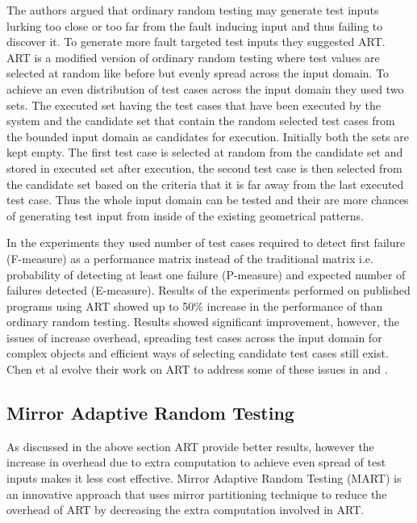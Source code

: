 The authors argued that ordinary random testing may generate test inputs lurking too close or too far from the fault inducing input and thus failing to discover it. To generate more fault targeted test inputs they suggested ART. ART is a modified version of ordinary random testing where test values are selected at random like before but evenly spread across the input domain. To achieve an even distribution of test cases across the input domain they used two sets. The executed set having the test cases that have been executed by the system and the candidate set that contain the random selected test cases from the bounded input domain as candidates for execution. Initially both the sets are kept empty. The first test case is selected at random from the candidate set and stored in executed set after execution, the second test case is then selected from the candidate set based on the criteria that it is far away from the last executed test case. Thus the whole input domain can be tested and their are more chances of generating test input from inside of the existing geometrical patterns. 

In the experiments they used number of test cases required to detect first failure (F-measure) as a performance matrix instead of the traditional matrix i.e. probability of detecting at least one failure (P-measure) and expected number of failures detected (E-measure). Results of the experiments performed on published programs using ART showed up to 50\% increase in the performance of than ordinary random testing. Results showed significant improvement, however, the issues of increase overhead, spreading test cases across the input domain for complex objects and efficient ways of selecting candidate test cases still exist. Chen et al evolve their work on ART to address some of these issues in \cite{chen2009enhanced} and \cite{Chen2005}. 

\subsection{Mirror Adaptive Random Testing}
As discussed in the above section ART provide better results, however the increase in overhead due to extra computation to achieve even spread of test inputs makes it less cost effective. Mirror Adaptive Random Testing (MART) \cite{Chen2003} is an innovative approach that uses mirror partitioning technique to reduce the overhead of ART by decreasing the extra computation involved in ART.

